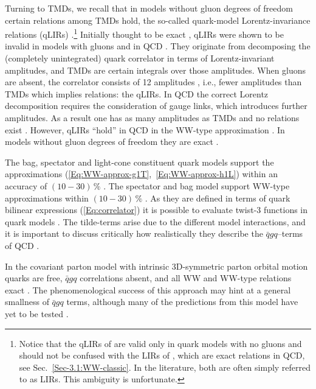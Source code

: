 \documentclass[a4paper,11pt]{article}
\begin{document}
Turning to TMDs, we recall that in models without gluon
degrees of freedom certain relations among TMDs hold, the
so-called quark-model Lorentz-invariance relations (qLIRs)
\cite{Tangerman:1994bb,Mulders:1995dh}.\footnote{Notice that
	the qLIRs of \cite{Tangerman:1994bb,Mulders:1995dh} are
	valid only in quark models with no gluons and should not
	be confused with the LIRs of \cite{Kanazawa:2015ajw}, which
	are exact relations in QCD, see Sec.~\ref{Sec-3.1:WW-classic}.
	In the literature, both are often simply referred to as LIRs.
	This ambiguity is unfortunate.}
Initially thought to be exact \cite{Tangerman:1994bb,Mulders:1995dh},
qLIRs were shown  to be invalid in models with gluons
\cite{Kundu:2001pk,Schlegel:2004rg} and in QCD \cite{Goeke:2003az}.
They originate from decomposing the (completely unintegrated)
quark correlator in terms of Lorentz-invariant amplitudes, and
TMDs are certain integrals over those amplitudes.
When gluons are absent, the correlator consists
of 12 amplitudes \cite{Tangerman:1994bb,Mulders:1995dh}, i.e., fewer
amplitudes than TMDs which implies relations: the qLIRs.
In QCD the correct Lorentz decomposition requires the consideration of
gauge links, which introduces further amplitudes. As a result one has
as many amplitudes as TMDs and no relations exist \cite{Goeke:2003az}.
However, qLIRs ``hold'' in QCD in the WW-type approximation
\cite{Metz:2008ib}. In models without gluon degrees of freedom
they are exact
\cite{Metz:2008ib,Teckentrup:2009tk,Avakian:2010br,Jakob:1997wg}.

The bag, spectator and light-cone constituent quark models support
the approximations (\ref{Eq:WW-approx-g1T},~\ref{Eq:WW-approx-h1L})
within an accuracy of $(10-30)\,\%$
\cite{Jakob:1997wg,Pasquini:2008ax,Avakian:2010br,Lorce:2011dv}.
The spectator and bag model support WW-type approximations
within $(10-30)\,\%$ \cite{Avakian:2010br}.
As they are defined in terms of quark bilinear expressions
(\ref{Eq:correlator}) it is possible to evaluate twist-3 functions
in quark models \cite{Jaffe:1991ra}. The tilde-terms arise due to
the different model interactions, and it is important to discuss
critically how realistically they describe the $\bar{q}gq$--terms
of QCD \cite{Lorce:2014hxa,Lorce:2016ugb}.

In the covariant parton model with intrinsic 3D-symmetric parton
orbital motion \cite{Zavada:1996kp}  quarks are free, $\bar{q}gq$
correlations absent, and all WW and WW-type relations exact
\cite{Efremov:2010mt,Efremov:2009ze}.
The phenomenological success of this approach \cite{Zavada:1996kp} may
hint at a general smallness of $\bar{q}gq$ terms, although many of the
predictions from this model have yet to be tested \cite{Efremov:2010mt}.
\end{document}
